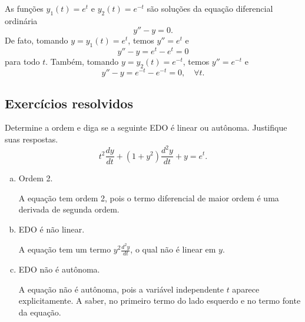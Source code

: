\begin{ex}
  As funções $y_1(t) = e^t$ e $y_2(t) = e^{-t}$ são soluções da equação diferencial ordinária
  \begin{equation}
    y'' - y = 0.
  \end{equation}
  De fato, tomando $y = y_1(t) = e^t$, temos $y'' = e^t$ e
  \begin{equation}
    y'' - y = e^t - e^t = 0
  \end{equation}
  para todo $t$.
  Também, tomando $y = y_2(t) = e^{-t}$, temos $y'' = e^{-t}$ e
  \begin{equation}
    y'' - y = e^{-t} - e^{-t} = 0, \quad\forall t.
  \end{equation}
\end{ex}

\subsection*{Exercícios resolvidos}

\begin{exeresol}
  Determine a ordem e diga se a seguinte EDO é linear ou autônoma. Justifique suas respostas.
  \begin{equation}
    t^2\frac{dy}{dt} + (1+y^2)\frac{d^2y}{dt} + y = e^t.
  \end{equation}
\end{exeresol}
\begin{resol}
  \begin{enumerate}[a)]
  \item Ordem 2.

    A equação tem ordem 2, pois o termo diferencial de maior ordem é uma derivada de segunda ordem.

  \item EDO é não linear.

    A equação tem um termo $\displaystyle y^2\frac{d^2y}{dt}$, o qual não é linear em $y$.

  \item EDO não é autônoma.

    A equação não é autônoma, pois a variável independente $t$ aparece explicitamente. A saber, no primeiro termo do lado esquerdo e no termo fonte da equação.
  \end{enumerate}
\end{resol}

